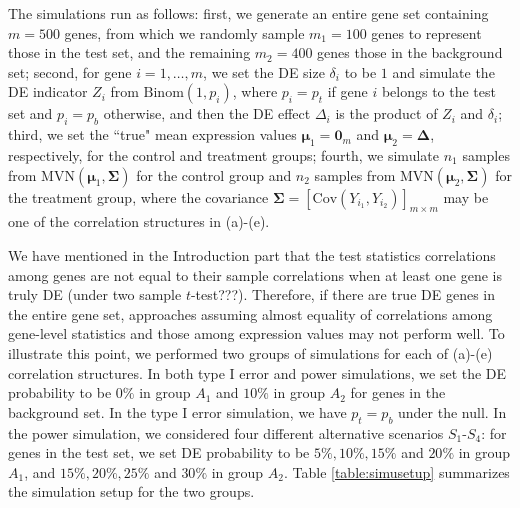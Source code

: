 \documentclass[useAMS,usenatbib, galley]{biom}
\newcommand{\aaCase}{a}
\newcommand{\fCase}{e}
\begin{document}
		The simulations run as follows: first, we generate an entire gene set containing $m=500$ genes, from which we randomly sample $m_1 = 100$ genes to represent those in the test set, and the remaining $m_2=400$ genes those in the background set; second, for gene $i=1, \ldots, m$, we set the DE size $\delta_i$ to be $1$ and simulate the DE indicator $Z_i$ from $\text{Binom}(1, p_i)$,  where $p_i= p_t$ if gene $i$ belongs to the test set and $p_i = p_b$  otherwise, and then the DE effect $\Delta_i$ is the product of $Z_i$ and $\delta_i$; third, we set the ``true" mean expression values $\bm \mu_1 = \bm 0_m$ and $\bm \mu_2 = \bm \Delta$, respectively,  for the control and treatment groups; fourth, we simulate $n_1$ samples from $\text{MVN}(\bm \mu_1, \bm \Sigma)$ for the control group and $n_2$ samples from $\text{MVN}(\bm \mu_2, \bm \Sigma)$ for the treatment group, where the covariance $\bm \Sigma = \left[\text{Cov}(Y_{i_1}, Y_{i_2})\right]_{m\times m}$ may be one of the correlation structures in (\aaCase)-(\fCase).
		
		We have mentioned in the Introduction part that the test statistics correlations among genes are not equal to their sample correlations when at least one gene is truly DE (under two sample $t$-test???). Therefore, if there are true DE genes in the entire gene set, approaches assuming almost equality of correlations among gene-level statistics and those among expression values may not perform well. To illustrate this point, we performed two groups of simulations for each of  (\aaCase)-(\fCase) correlation structures. In both type I error and power simulations, we set the DE probability to be $0\%$ in group $A_1$ and $10\%$ in group $A_2$ for genes in the background set. In the type I error simulation, we have $p_t = p_b$ under the null. In the power simulation, we considered four different alternative scenarios $S_1$-$S_4$: for genes in the test set, we set DE probability to be $5\%, 10\%, 15\%$ and $20\%$ in group $A_1$, and $15\%, 20\%, 25\%$ and $30\%$ in group $A_2$. Table \ref{table:simusetup} summarizes the simulation setup for the two groups.
		
		
		
\end{document}
